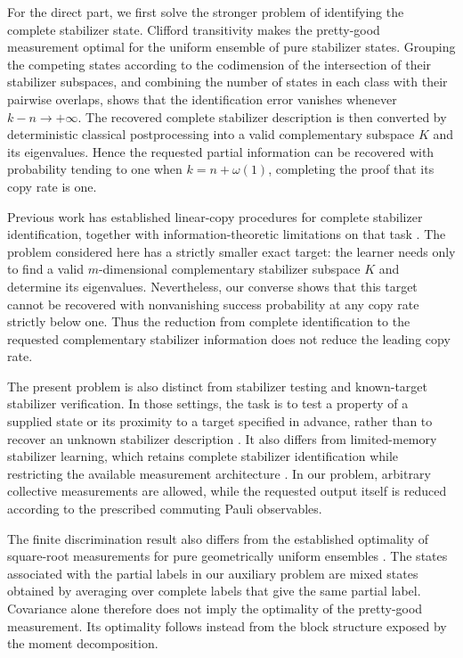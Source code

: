 \documentclass[11pt]{article}
\newcommand{\1}{\mathbf 1}
\theoremstyle{plain}
\theoremstyle{definition}
\theoremstyle{remark}
\begin{document}
For the direct part, we first solve the stronger problem of identifying the complete stabilizer state. Clifford transitivity makes the pretty-good measurement optimal for the uniform ensemble of pure stabilizer states. Grouping the competing states according to the codimension of the intersection of their stabilizer subspaces, and combining the number of states in each class with their pairwise overlaps, shows that the identification error vanishes whenever $k-n\to+\infty$. The recovered complete stabilizer description is then converted by deterministic classical postprocessing into a valid complementary subspace $K$ and its eigenvalues. Hence the requested partial information can be recovered with probability tending to one when $k=n+\omega(1)$, completing the proof that its copy rate is one.


Previous work has established linear-copy procedures for complete stabilizer identification, together with information-theoretic limitations on that task \cite{AaronsonGottesman2008,Montanaro2017BellSampling}. 
The problem considered here has a strictly smaller exact target: the learner needs only to find a valid $m$-dimensional complementary stabilizer subspace $K$ and determine its eigenvalues. Nevertheless, our converse shows that this target cannot be recovered with nonvanishing success probability at any copy rate strictly below one. Thus the reduction from complete identification to the requested complementary stabilizer information does not reduce the leading copy rate.

The present problem is also distinct from stabilizer testing and known-target stabilizer verification. In those settings, the task is to test a property of a supplied state or its proximity to a target specified in advance, rather than to recover an unknown stabilizer description \cite{HayashiMorimae2015StabilizerTesting, DangniamHanZhu2020Verification,HinscheHelsen2025Testing}. 
It also differs from limited-memory stabilizer learning, which retains complete stabilizer identification while restricting the available measurement architecture \cite{ArunachalamSchatzki2026LimitedMemory}. In our problem, arbitrary collective measurements are allowed, while the requested output itself is reduced according to the prescribed commuting Pauli observables.

The finite discrimination result also differs from the established optimality of square-root measurements for pure geometrically uniform ensembles \cite{EldarForney2001SRM}. The states associated with the partial labels in our auxiliary problem are mixed states obtained by averaging over complete labels that give the same partial label. Covariance alone therefore does not imply the optimality of the pretty-good measurement. Its optimality follows instead from the block structure exposed by the moment decomposition.
\end{document}
